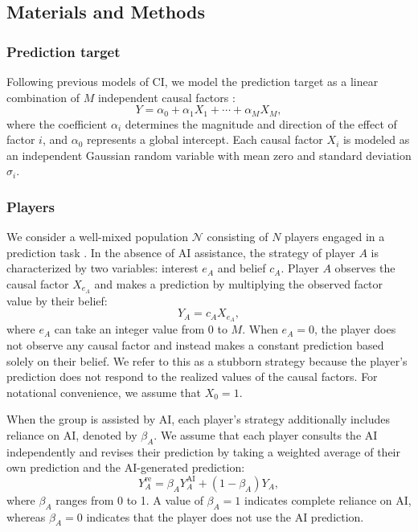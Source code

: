 \documentclass[12pt]{article}
\begin{document}
\subsection*{Materials and Methods}

\subsubsection*{Prediction target}

Following previous models of CI, we model the prediction target as a linear combination of $M$ independent causal factors \citep{hong2012incentives,mann2017optimal,wang2025individual}:
\begin{equation}
Y = \alpha_0 + \alpha_1 X_1 + \cdots + \alpha_M X_M,
\end{equation}
where the coefficient $\alpha_i$ determines the magnitude and direction of the effect of factor $i$, and $\alpha_0$ represents a global intercept. 
Each causal factor $X_i$ is modeled as an independent Gaussian random variable with mean zero and standard deviation $\sigma_i$.

\subsubsection*{Players}

We consider a well-mixed population $\mathcal{N}$ consisting of $N$ players engaged in a prediction task \citep{wang2025individual}. 
In the absence of AI assistance, the strategy of player $A$ is characterized by two variables: interest $e_A$ and belief $c_A$. 
Player $A$ observes the causal factor $X_{e_A}$ and makes a prediction by multiplying the observed factor value by their belief:
\begin{equation}
Y_A = c_A X_{e_A},
\end{equation}
where $e_A$ can take an integer value from 0 to $M$. 
When $e_A=0$, the player does not observe any causal factor and instead makes a constant prediction based solely on their belief. 
We refer to this as a stubborn strategy because the player's prediction does not respond to the realized values of the causal factors. 
For notational convenience, we assume that $X_0=1$.

When the group is assisted by AI, each player's strategy additionally includes reliance on AI, denoted by $\beta_A$. We assume that each player consults the AI independently and revises their prediction by taking a weighted average of their own prediction and the AI-generated prediction:
\begin{equation}
Y_A^{\mathrm{re}} = \beta_A Y_A^{\mathrm{AI}} + (1-\beta_A)Y_A,
\end{equation}
where $\beta_A$ ranges from 0 to 1. 
A value of $\beta_A=1$ indicates complete reliance on AI, whereas $\beta_A=0$ indicates that the player does not use the AI prediction.
\end{document}
